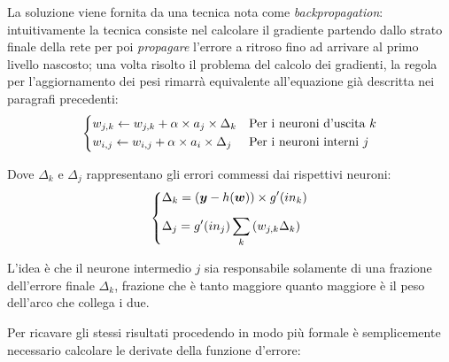 \documentclass[../../main.tex]{subfiles}
\begin{document}
La soluzione viene fornita da una tecnica nota come \textit{backpropagation}: intuitivamente la tecnica consiste nel calcolare il gradiente partendo dallo strato finale della rete per poi \textit{propagare} l'errore a ritroso fino ad arrivare al primo livello nascosto; una volta risolto il problema del calcolo dei gradienti, la regola per l'aggiornamento dei pesi rimarrà equivalente all'equazione già descritta nei paragrafi precedenti:
\begin{equation}
    \begin{dcases}
        w_{j,k} \leftarrow w_{j,k} + \alpha \times a_j \times \Delta_k & \text{Per i neuroni d'uscita } k\\
        w_{i,j} \leftarrow w_{i,j} + \alpha \times a_i \times \Delta_j & \text{Per i neuroni interni } j
    \end{dcases}   
\end{equation}

Dove $\Delta_k$ e $\Delta_j$ rappresentano gli errori commessi dai rispettivi neuroni:
\[
\begin{dcases}
    \Delta_k = (\boldsymbol{y} - h(\boldsymbol{w})) \times g'(in_k)\\[5pt]
    \Delta_j = g'(in_j) \sum_k \left(w_{j,k} \Delta_k \right)
\end{dcases}    
\]

L'idea è che il neurone intermedio $j$ sia responsabile solamente di una frazione dell'errore finale $\Delta_k$, frazione che è tanto maggiore quanto maggiore è il peso dell'arco che collega i due.

Per ricavare gli stessi risultati procedendo in modo più formale è semplicemente necessario calcolare le derivate della funzione d'errore:
\end{document}
